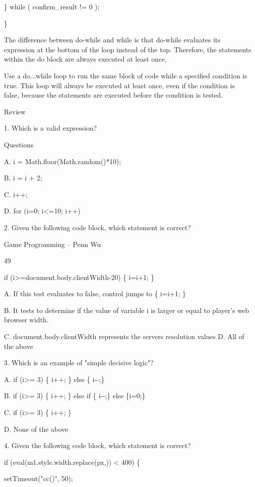 \documentclass[
]{article}
\begin{document}
\} while ( confirm\_result != 0 );

\}

The difference between do-while and while is that do-while evaluates its
expression at the bottom of the loop instead of the top. Therefore, the
statements within the do block are always executed at least once,

Use a do...while loop to run the same block of code while a specified
condition is true. This loop will always be executed at least once, even
if the condition is false, because the statements are executed before
the condition is tested.

Review

1. Which is a valid expression?

Questions

A. i = Math.floor(Math.random()*10);

B. i = i + 2;

C. i++;

D. for (i=0; i\textless=10; i++)

2. Given the following code block, which statement is correct?

Game Programming -- Penn Wu

49

\protect\hypertarget{index_split_004.htmlux5cux23p50}{}{}

if (i\textgreater=document.body.clientWidth-20) \{ i=i+1; \}

A. If this test evaluates to false, control jumps to \{ i=i+1; \}

B. It tests to determine if the value of variable i is larger or equal
to player's web browser width.

C. document.body.clientWidth represents the server\textquotesingle s
resolution values D. All of the above

3. Which is an example of "simple decisive logic"?

A. if (i\textgreater= 3) \{ i++; \} else \{ i-\/-;\}

B. if (i\textgreater= 3) \{ i++; \} else if \{ i-\/-;\} else \{i=0;\}

C. if (i\textgreater= 3) \{ i++; \}

D. None of the above

4. Given the following code block, which statement is correct?

if
(eval(m1.style.width.replace(\textquotesingle px\textquotesingle,\textquotesingle\textquotesingle))
\textless{} 400) \{

setTimeout("cc()", 50);
\end{document}
